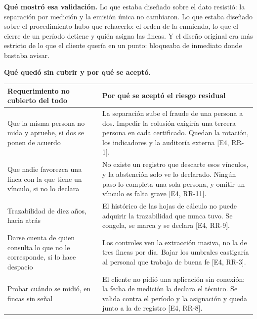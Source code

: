 \documentclass[11pt,letterpaper]{article}
\newcommand{\cab}[1]{\textbf{\rmfamily #1}}
\newcommand{\ev}[1]{\textrm{\small [#1]}}   %
\begin{document}
\textbf{Qué mostró esa validación.} Lo que estaba diseñado sobre el dato resistió: la separación por
medición y la emisión única no cambiaron. Lo que estaba diseñado sobre el procedimiento hubo que
rehacerlo: el orden de la enmienda, lo que el cierre de un período detiene y quién asigna las fincas.
Y el diseño original era más estricto de lo que el cliente quería en un punto: bloqueaba de inmediato
donde bastaba avisar.

\Needspace{7cm}
\textbf{Qué quedó sin cubrir y por qué se aceptó.}

\begin{center}
\small
\renewcommand{\arraystretch}{1.25}
\begin{tabularx}{\textwidth}{@{}L{4.4cm} Y@{}}
\toprule
\cab{Requerimiento no cubierto del todo} & \cab{Por qué se aceptó el riesgo residual} \\
\midrule
Que la misma persona no mida y apruebe, si dos se ponen de acuerdo & La separación sube el fraude de una persona a dos. Impedir la colusión exigiría una tercera persona en cada certificado. Quedan la rotación, los indicadores y la auditoría externa \ev{E4, RR-1}. \\
Que nadie favorezca una finca con la que tiene un vínculo, si no lo declara & No existe un registro que descarte esos vínculos, y la abstención solo ve lo declarado. Ningún paso lo completa una sola persona, y omitir un vínculo es falta grave \ev{E4, RR-11}. \\
Trazabilidad de diez años, hacia atrás & El histórico de las hojas de cálculo no puede adquirir la trazabilidad que nunca tuvo. Se congela, se marca y se declara \ev{E4, RR-9}. \\
Darse cuenta de quien consulta lo que no le corresponde, si lo hace despacio & Los controles ven la extracción masiva, no la de tres fincas por día. Bajar los umbrales castigaría al personal que trabaja de buena fe \ev{E4, RR-3}. \\
Probar cuándo se midió, en fincas sin señal & El cliente no pidió una aplicación sin conexión: la fecha de medición la declara el técnico. Se valida contra el período y la asignación y queda junto a la de registro \ev{E4, RR-8}. \\
\bottomrule
\end{tabularx}
\end{center}
\end{document}

